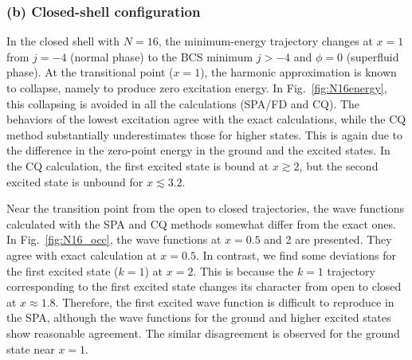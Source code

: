 \documentclass[11pt]{book} %
\begin{document}
\subsubsection{(b) Closed-shell configuration}


In the closed shell with $N=16$,
the minimum-energy trajectory changes at $x=1$ from
$j=-4$ (normal phase) to
the BCS minimum $j>-4$ and $\phi=0$ (superfluid phase).
At the transitional point ($x=1$), the harmonic approximation is
known to collapse, namely to produce zero excitation energy.
In Fig.~\ref{fig:N16energy},
this collapsing is avoided in all the calculations (SPA/FD and CQ).
The behaviors of the lowest excitation agree with the exact calculations,
while the CQ method substantially underestimates those for higher states.
This is again due to the difference in the zero-point energy in
the ground and the excited states.
In the CQ calculation, the first excited state is bound at $x\gtrsim 2$,
but the second excited state is unbound for $x\lesssim 3.2$.

Near the transition point from the open to closed trajectories,
the wave functions calculated with the SPA and CQ methods somewhat differ
from the exact ones.
In Fig.~\ref{fig:N16_occ}, the wave functions at $x=0.5$ and 2 are presented.
They agree with exact calculation at $x=0.5$.
In contrast, we find some deviations for the first excited state ($k=1$)
at $x=2$.
This is because the $k=1$ trajectory corresponding to the first excited state
changes its character from open to closed at $x\approx 1.8$.
Therefore, the first excited wave function is difficult to reproduce in
the SPA, although the wave functions for
the ground and higher excited states show reasonable agreement.
The similar disagreement is observed for the ground state near $x=1$.
\end{document}
